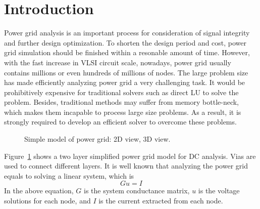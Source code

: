 \documentclass{sig-alternate}
\begin{document}
\section{Introduction}
Power grid analysis is an important process for consideration of signal integrity and further design 
optimization. To shorten the design period and cost, power grid simulation should be finished within a resonable amount of time. 
However, with the fast increase in VLSI circuit scale, nowadays, power grid usually contains millions or even hundreds of millions 
of nodes. The large problem size has made efficiently analyzing power grid a very challenging task. It would be prohibitively 
expensive for traditional solvers such as direct LU to solve the problem. Besides, traditional methods may suffer from memory 
bottle-neck, which makes them incapable to process large size problems. As a result, it is strongly required to develop an efficient 
solver to overcome these problems.
	\begin{figure}[htbp]
	  \caption{Simple model of power grid: 
	   2D view,
	   3D view.}
	  \label{pg_model}
	\end{figure}

	Figure~\ref{pg_model} shows a two layer simplified power grid model for DC analysis. Vias are used to 
	connect different layers. It is well known that analyzing the power grid equals to solving a linear system, which is 
	\begin{equation}\label{eq1}
		Gu=I
	\end{equation}
In the above equation, $G$ is the system conductance matrix, $u$ is the voltage solutions for each node, and $I$ is the current 
extracted from each node.
\end{document}
